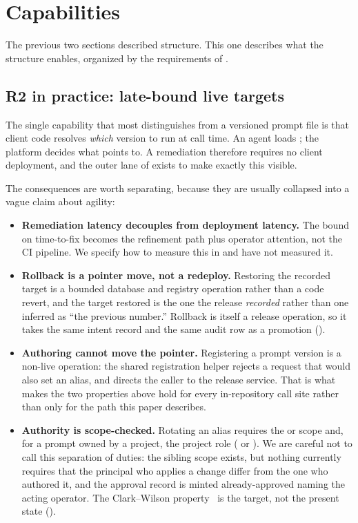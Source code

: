 \section{Capabilities}
\label{sec:capabilities}

The previous two sections described structure. This one describes what the
structure enables, organized by the requirements of .

\subsection{R2 in practice: late-bound live targets}

The single capability that most distinguishes \sys from a versioned prompt file is
that client code resolves \emph{which} version to run at call time. An agent loads
\prodalias{}; the platform decides what \prodalias{} points to. A remediation
therefore requires no client deployment, and the outer lane of
 exists to make exactly this visible.

The consequences are worth separating, because they are usually collapsed into a
vague claim about agility:

\begin{itemize}
\item \textbf{Remediation latency decouples from deployment latency.} The bound on
      time-to-fix becomes the refinement path plus operator attention, not the CI
      pipeline. We specify how to measure this in  and have
      not measured it.
\item \textbf{Rollback is a pointer move, not a redeploy.} Restoring the recorded
      target is a bounded database and registry operation rather than a code
      revert, and the target restored is the one the release \emph{recorded}
      rather than one inferred as ``the previous number.'' Rollback is itself a
      release operation, so it takes the same intent record and the same audit
      row as a promotion ().
\item \textbf{Authoring cannot move the pointer.} Registering a prompt version is
      a non-live operation: the shared registration helper rejects a request that
      would also set an alias, and directs the caller to the release service.
      That is what makes the two properties above hold for every in-repository
      call site rather than only for the path this paper describes.
\item \textbf{Authority is scope-checked.} Rotating an alias requires the
      \operator{} or \admin{} scope and, for a prompt owned by a project, the
       project role ( or ). We are careful not to call this separation of
      duties: the sibling \approver{} scope exists, but nothing currently requires
      that the principal who applies a change differ from the one who authored it,
      and the approval record is minted already-approved naming the acting
      operator. The Clark--Wilson property~\cite{clark1987integrity} is the target,
      not the present state ().
\end{itemize}

